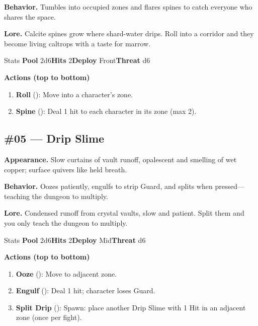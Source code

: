 \textbf{Behavior.} Tumbles into occupied zones and flares spines to catch everyone who shares the space.

\textbf{Lore.} Calcite spines grow where shard-water drips. Roll into a corridor and they become living caltrops with a taste for marrow.

\begin{monsterentry}{Stats}
\textbf{Pool} 2d6\quad\textbf{Hits} 2\quad\textbf{Deploy} Front\quad\textbf{Threat} d6

\textbf{Actions (top to bottom)}
\begin{enumerate}\setlength{\itemsep}{0.15em}\setlength{\parskip}{0pt}
  \item \textbf{Roll} (\easy): Move into a character's zone.
  \item \textbf{Spine} (\medium): Deal 1 hit to each character in its zone (max 2).
\end{enumerate}
\end{monsterentry}

\subsection*{\#05 --- Drip Slime}

\textbf{Appearance.} Slow curtains of vault runoff, opalescent and smelling of wet copper; surface quivers like held breath.

\textbf{Behavior.} Oozes patiently, engulfs to strip Guard, and splits when pressed---teaching the dungeon to multiply.

\textbf{Lore.} Condensed runoff from crystal vaults, slow and patient. Split them and you only teach the dungeon to multiply.

\begin{monsterentry}{Stats}
\textbf{Pool} 2d6\quad\textbf{Hits} 2\quad\textbf{Deploy} Mid\quad\textbf{Threat} d6

\textbf{Actions (top to bottom)}
\begin{enumerate}\setlength{\itemsep}{0.15em}\setlength{\parskip}{0pt}
  \item \textbf{Ooze} (\easy): Move to adjacent zone.
  \item \textbf{Engulf} (\medium): Deal 1 hit; character loses Guard.
  \item \textbf{Split Drip} (\hard): Spawn: place another Drip Slime with 1 Hit in an adjacent zone (once per fight).
\end{enumerate}
\end{monsterentry}

